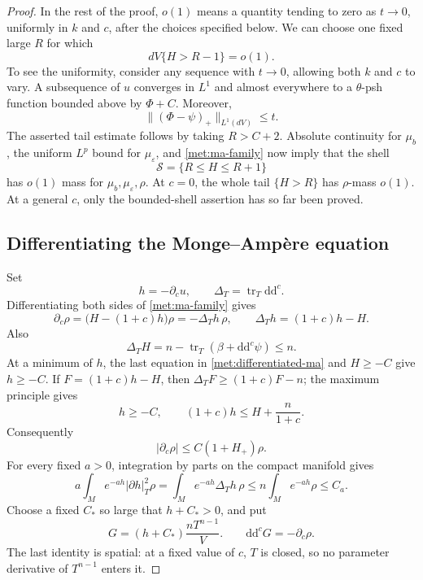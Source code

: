 \documentclass[11pt,letterpaper]{article}
\newcommand{\ddc}{\mathrm{d}\mathrm{d}^{c}}
\DeclareMathOperator{\tr}{tr}
\theoremstyle{definition}
\theoremstyle{remark}
\begin{document}
\begin{proof}
In the rest of the proof, \(o(1)\) means a quantity tending to zero
as \(t\to0\), uniformly in \(k\) and \(c\), after the choices specified
below.  We can choose one fixed large \(R\) for which
\begin{equation}
 \label{met:small-volume-tail}
 dV\{H>R-1\}=o(1).
\end{equation}
To see the uniformity, consider any sequence with \(t\to0\), allowing
both \(k\) and \(c\) to vary.  A subsequence of \(u\) converges in
\(L^1\) and almost everywhere to a \(\theta\)-psh function bounded
above by \(\Phi+C\).  Moreover,
\[
 \| (\Phi-\psi)_+\|_{L^1(dV)}\leq t.
\]
The asserted tail estimate follows by taking \(R>C+2\).
Absolute continuity for \(\mu_b\), the uniform \(L^p\) bound for
\(\mu_\varepsilon\), and \eqref{met:ma-family} now imply that the
shell
\begin{equation}
 \label{met:shell}
 \mathcal S=\{R\leq H\leq R+1\}
\end{equation}
has \(o(1)\) mass for \(\mu_b,\mu_\varepsilon,\rho\).
At \(c=0\), the whole tail \(\{H>R\}\) has \(\rho\)-mass \(o(1)\).
At a general \(c\), only the bounded-shell assertion has so far
been proved.

\subsection*{Differentiating the Monge--Amp\`ere equation}

Set
\[
 h=-\partial_cu,
 \qquad \Delta_T=\tr_T\ddc.
\]
Differentiating both sides of \eqref{met:ma-family} gives
\begin{equation}
 \label{met:differentiated-ma}
 \partial_c\rho
   =\bigl(H-(1+c)h\bigr)\rho
   =-\Delta_T h\,\rho,
 \qquad
 \Delta_T h=(1+c)h-H.
\end{equation}
Also
\[
 \Delta_T H
   =n-\tr_T(\beta+\ddc\psi)\leq n.
\]
At a minimum of \(h\), the last equation in
\eqref{met:differentiated-ma} and \(H\geq-C\) give \(h\geq-C\).
If \(F=(1+c)h-H\), then
\(\Delta_TF\geq(1+c)F-n\); the maximum principle gives
\begin{equation}
 \label{met:h-bounds}
 h\geq-C,
 \qquad
 (1+c)h\leq H+\frac{n}{1+c}.
\end{equation}
Consequently
\begin{equation}
 \label{met:parameter-variation}
 |\partial_c\rho|\leq C(1+H_+)\rho.
\end{equation}
For every fixed \(a>0\), integration by parts on the compact manifold
gives
\begin{equation}
 \label{met:h-energy}
 a\int_M e^{-ah}|\partial h|_T^2\rho
 =\int_M e^{-ah}\Delta_T h\,\rho
 \leq n\int_Me^{-ah}\rho
 \leq C_a.
\end{equation}
Choose a fixed \(C_*\) so large that \(h+C_*>0\), and put
\begin{equation}
 \label{met:transport-form}
 G=(h+C_*)\frac{nT^{n-1}}V.
 \qquad
 \ddc G=-\partial_c\rho.
\end{equation}
The last identity is spatial: at a fixed value of \(c\), \(T\) is
closed, so no parameter derivative of \(T^{n-1}\) enters it.


\end{proof}
\end{document}
